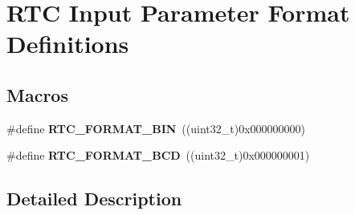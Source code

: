 \hypertarget{group___r_t_c___input__parameter__format__definitions}{}\section{R\+TC Input Parameter Format Definitions}
\label{group___r_t_c___input__parameter__format__definitions}
\subsection*{Macros}
\begin{DoxyCompactItemize}
\item 
\#define {\bfseries R\+T\+C\+\_\+\+F\+O\+R\+M\+A\+T\+\_\+\+B\+IN}~((uint32\+\_\+t)0x000000000)\hypertarget{group___r_t_c___input__parameter__format__definitions_gadf5ce0bf2d5b4814fb3911f63d7ffb17}{}\label{group___r_t_c___input__parameter__format__definitions_gadf5ce0bf2d5b4814fb3911f63d7ffb17}

\item 
\#define {\bfseries R\+T\+C\+\_\+\+F\+O\+R\+M\+A\+T\+\_\+\+B\+CD}~((uint32\+\_\+t)0x000000001)\hypertarget{group___r_t_c___input__parameter__format__definitions_ga20d772c2e0ba75287a3655780fd0c39b}{}\label{group___r_t_c___input__parameter__format__definitions_ga20d772c2e0ba75287a3655780fd0c39b}

\end{DoxyCompactItemize}


\subsection{Detailed Description}
